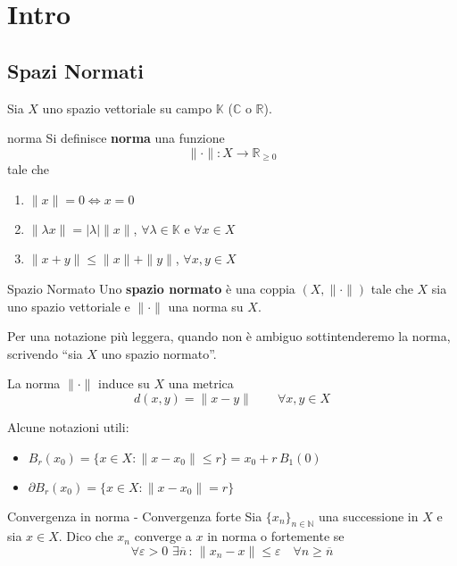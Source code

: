 \section{Intro}
\subsection{Spazi Normati}
Sia \(X\) uno spazio vettoriale su campo \(\mathbb{K}\) (\(\mathbb{C}\) o \(\mathbb{R}\)). 
\begin{definition}{norma}
    Si definisce \textbf{norma} una funzione
    \[
      \|\cdot \|: X \to \mathbb{R}_{\ge 0} 
    \]
    tale che
\begin{enumerate}[label = \roman*.]
    \item \(\|x\|=0 \iff x=0\) 
    \item \(\|\lambda x\| = |\lambda|\|x\|\), \(\forall \lambda \in \mathbb{K}\) e \(\forall x \in X\) 
    \item \(\|x + y\| \le \|x\| + \|y\|\), \(\forall x, y \in X\) 
\end{enumerate}
\end{definition}

\begin{definition}{Spazio Normato}
    Uno \textbf{spazio normato} è una coppia \({(X, \|\cdot \|)}\) tale che \(X\) sia uno spazio vettoriale e \(\|\cdot \|\) una norma su \(X\).
\end{definition}
Per una notazione più leggera, quando non è ambiguo sottintenderemo la norma,
scrivendo ``sia \(X\) uno spazio normato''.

\begin{proposition}
    La norma \(\|\cdot \|\) induce su \(X\) una metrica
    \[
      d{(x, y)} = \|x - y\|\quad\quad \forall x, y \in X
    \]
\end{proposition}

\begin{note}[zioni]
    Alcune notazioni utili: 
\begin{itemize}[label = --]
    \item \(B_r{(x_{0})} = \{x \in X : \|x - x_{0}\| \le r\} = x_{0} + r\,B_1{(0)} \)
    \item \(\partial B_r{(x_{0})} = \{x \in X : \|x - x_{0}\| = r\} \) 
\end{itemize}
\end{note}

\begin{definition}{Convergenza in norma - Convergenza forte}
    Sia \(\{x_{n}\}_{n \in \mathbb{N}} \) una successione in \(X\) e sia \(x \in X\). Dico che \(x_{n}\) converge a \(x\) in norma o fortemente se 
    \[
      \forall \varepsilon > 0 \,\,\exists \overline{n}\, :\, \|x_{n} - x\| \le \varepsilon \quad \forall n \ge \overline{n}
    \]
\end{definition}

